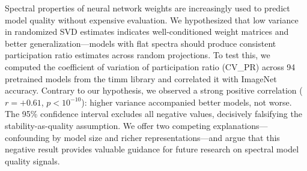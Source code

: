 Spectral properties of neural network weights are increasingly used to predict model quality without expensive evaluation. We hypothesized that low variance in randomized SVD estimates indicates well-conditioned weight matrices and better generalization---models with flat spectra should produce consistent participation ratio estimates across random projections. To test this, we computed the coefficient of variation of participation ratio (CV\_PR) across 94 pretrained models from the timm library and correlated it with ImageNet accuracy. Contrary to our hypothesis, we observed a strong positive correlation ($r = +0.61$, $p < 10^{-10}$): higher variance accompanied better models, not worse. The 95\% confidence interval excludes all negative values, decisively falsifying the stability-as-quality assumption. We offer two competing explanations---confounding by model size and richer representations---and argue that this negative result provides valuable guidance for future research on spectral model quality signals.

